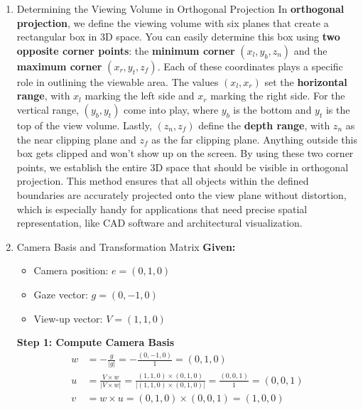 \documentclass{article}
\begin{document}
\begin{enumerate}
    \item Determining the Viewing Volume in Orthogonal Projection
        \medbreak
        In \textbf{orthogonal projection}, we define the viewing volume with six planes that create a rectangular box in 3D space. You can easily determine this box using \textbf{two opposite corner points}: the \textbf{minimum corner} $(x_l, y_b, z_n)$ and the \textbf{maximum corner} $(x_r, y_t, z_f)$.
        \medbreak
        Each of these coordinates plays a specific role in outlining the viewable area. The values $(x_l, x_r)$ set the \textbf{horizontal range}, with $x_l$ marking the left side and $x_r$ marking the right side. For the vertical range, $(y_b, y_t)$ come into play, where $y_b$ is the bottom and $y_t$ is the top of the view volume. Lastly, $(z_n, z_f)$ define the \textbf{depth range}, with $z_n$ as the near clipping plane and $z_f$ as the far clipping plane. Anything outside this box gets clipped and won’t show up on the screen.
        \medbreak
        By using these two corner points, we establish the entire 3D space that should be visible in orthogonal projection. This method ensures that all objects within the defined boundaries are accurately projected onto the view plane without distortion, which is especially handy for applications that need precise spatial representation, like CAD software and architectural visualization.
    \item Camera Basis and Transformation Matrix
        \medbreak
        \textbf{Given:}
        \begin{itemize}
            \item Camera position: $e = (0,1,0)$
            \item Gaze vector: $g = (0,-1,0)$
            \item View-up vector: $V = (1,1,0)$
        \end{itemize}
        
        \textbf{Step 1: Compute Camera Basis}
        \begin{align*}
            w &= -\frac{g}{|g|} = -\frac{(0,-1,0)}{1} = (0,1,0) \\
            u &= \frac{V \times w}{|V \times w|} = \frac{(1,1,0) \times (0,1,0)}{|(1,1,0) \times (0,1,0)|} = \frac{(0,0,1)}{1} = (0,0,1) \\
            v &= w \times u = (0,1,0) \times (0,0,1) = (1,0,0)
        \end{align*}
        

\end{enumerate}
\end{document}
